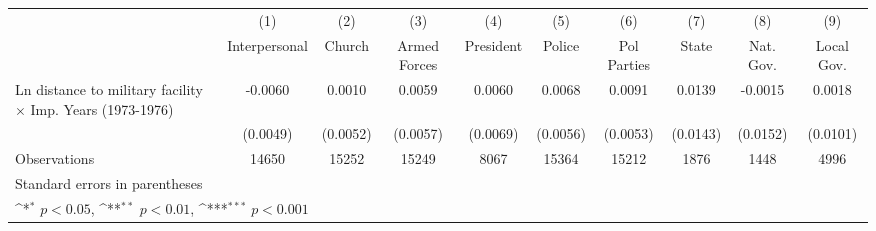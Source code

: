 {
\def\sym#1{\ifmmode^{#1}\else\(^{#1}\)\fi}
\begin{tabular}{l*{9}{c}}
\hline\hline
                    &\multicolumn{1}{c}{(1)}&\multicolumn{1}{c}{(2)}&\multicolumn{1}{c}{(3)}&\multicolumn{1}{c}{(4)}&\multicolumn{1}{c}{(5)}&\multicolumn{1}{c}{(6)}&\multicolumn{1}{c}{(7)}&\multicolumn{1}{c}{(8)}&\multicolumn{1}{c}{(9)}\\
                    &\multicolumn{1}{c}{Interpersonal}&\multicolumn{1}{c}{Church}&\multicolumn{1}{c}{Armed Forces}&\multicolumn{1}{c}{President}&\multicolumn{1}{c}{Police}&\multicolumn{1}{c}{Pol Parties}&\multicolumn{1}{c}{State}&\multicolumn{1}{c}{Nat. Gov.}&\multicolumn{1}{c}{Local Gov.}\\
\hline
Ln distance to military facility $\times$ Imp. Years (1973-1976)&     -0.0060         &      0.0010         &      0.0059         &      0.0060         &      0.0068         &      0.0091         &      0.0139         &     -0.0015         &      0.0018         \\
                    &    (0.0049)         &    (0.0052)         &    (0.0057)         &    (0.0069)         &    (0.0056)         &    (0.0053)         &    (0.0143)         &    (0.0152)         &    (0.0101)         \\
\hline
Observations        &       14650         &       15252         &       15249         &        8067         &       15364         &       15212         &        1876         &        1448         &        4996         \\
\hline\hline
\multicolumn{10}{l}{\footnotesize Standard errors in parentheses}\\
\multicolumn{10}{l}{\footnotesize \sym{*} \(p<0.05\), \sym{**} \(p<0.01\), \sym{***} \(p<0.001\)}\\
\end{tabular}
}

